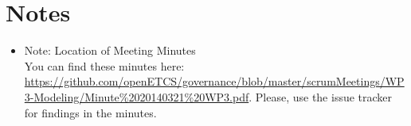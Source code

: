 \documentclass[a4paper, 11pt]{article}
\begin{document}
\section{Notes}
\begin{itemize}

\item Note: Location of Meeting Minutes\\
You can find these minutes here: \url{https://github.com/openETCS/governance/blob/master/scrumMeetings/WP3-Modeling/Minute%2020140321%20WP3.pdf}. Please, use the issue tracker for findings in the minutes.

\end{itemize}
\end{document}
